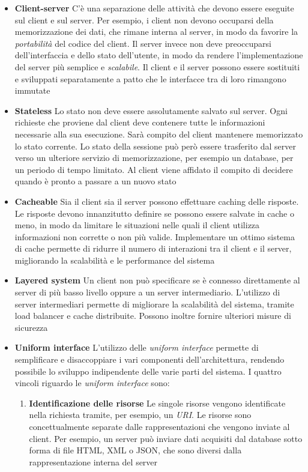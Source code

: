 \begin{itemize}
	\item \textbf{Client-server} C'è una separazione delle attività che devono essere eseguite sul client e sul server. Per esempio, i client non devono occuparsi della memorizzazione dei dati, che rimane interna al server, in modo da favorire la \emph{portabilità} del codice del client. Il server invece non deve preoccuparsi dell'interfaccia e dello stato dell'utente, in modo da rendere l'implementazione del server più semplice e \emph{scalabile}. Il client e il server possono essere sostituiti e sviluppati separatamente a patto che le interfacce tra di loro rimangono immutate
	\item \textbf{Stateless} Lo stato non deve essere assolutamente salvato sul server. Ogni richieste che proviene dal client deve contenere tutte le informazioni necessarie alla sua esecuzione. Sarà compito del client mantenere memorizzato lo stato corrente. Lo stato della sessione può però essere trasferito dal server verso un ulteriore servizio di memorizzazione, per esempio un database, per un periodo di tempo limitato. Al client viene affidato il compito di decidere quando è pronto a passare a un nuovo stato
	\item \textbf{Cacheable} Sia il client sia il server possono effettuare caching delle risposte. Le risposte devono innanzitutto definire se possono essere salvate in cache o meno, in modo da limitare le situazioni nelle quali il client utilizza informazioni non corrette o non più valide. Implementare un ottimo sistema di cache permette di ridurre il numero di interazioni tra il client e il server, migliorando la scalabilità e le performance del sistema
	\item \textbf{Layered system} Un client non può specificare se è connesso direttamente al server di più basso livello oppure a un server intermediario. L'utilizzo di server intermediari permette di migliorare la scalabilità del sistema, tramite load balancer e cache distribuite. Possono inoltre fornire ulteriori misure di sicurezza
	\item \textbf{Uniform interface} L'utilizzo delle \emph{uniform interface} permette di semplificare e disaccoppiare i vari componenti dell'architettura, rendendo possibile lo sviluppo indipendente delle varie parti del sistema. I quattro vincoli riguardo le \emph{uniform interface} sono:
	\begin{enumerate}
		\item \textbf{Identificazione delle risorse} Le singole risorse vengono identificate nella richiesta tramite, per esempio, un \emph{URI}. Le risorse sono concettualmente separate dalle rappresentazioni che vengono inviate al client. Per esempio, un server può inviare dati acquisiti dal database sotto forma di file HTML, XML o JSON, che sono diversi dalla rappresentazione interna del server

\end{enumerate}
\end{itemize}
